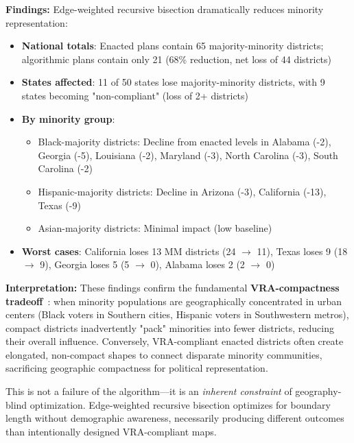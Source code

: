 \textbf{Findings:} Edge-weighted recursive bisection dramatically reduces minority representation:
\begin{itemize}
    \item \textbf{National totals}: Enacted plans contain 65 majority-minority districts; algorithmic plans contain only 21 (68\% reduction, net loss of 44 districts)
    \item \textbf{States affected}: 11 of 50 states lose majority-minority districts, with 9 states becoming "non-compliant" (loss of 2+ districts)
    \item \textbf{By minority group}:
        \begin{itemize}
            \item Black-majority districts: Decline from enacted levels in Alabama (-2), Georgia (-5), Louisiana (-2), Maryland (-3), North Carolina (-3), South Carolina (-2)
            \item Hispanic-majority districts: Decline in Arizona (-3), California (-13), Texas (-9)
            \item Asian-majority districts: Minimal impact (low baseline)
        \end{itemize}
    \item \textbf{Worst cases}: California loses 13 MM districts (24 $\to$ 11), Texas loses 9 (18 $\to$ 9), Georgia loses 5 (5 $\to$ 0), Alabama loses 2 (2 $\to$ 0)
\end{itemize}

\textbf{Interpretation:} These findings confirm the fundamental \textbf{VRA-compactness tradeoff}~\cite{pildes2004democracy, stephanopoulos2015partisan}: when minority populations are geographically concentrated in urban centers (Black voters in Southern cities, Hispanic voters in Southwestern metros), compact districts inadvertently "pack" minorities into fewer districts, reducing their overall influence. Conversely, VRA-compliant enacted districts often create elongated, non-compact shapes to connect disparate minority communities, sacrificing geographic compactness for political representation.

This is not a failure of the algorithm—it is an \textit{inherent constraint} of geography-blind optimization. Edge-weighted recursive bisection optimizes for boundary length without demographic awareness, necessarily producing different outcomes than intentionally designed VRA-compliant maps.

